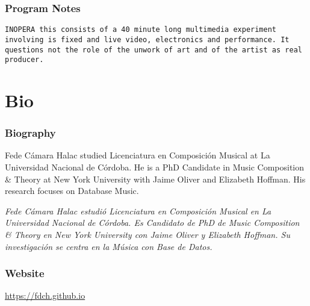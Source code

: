 \documentclass[
	12pt,
	letterpaper,
	oneside,
]{book}
\begin{document}
\section*{Program Notes}
\texttt{INOPERA this consists of a 40 minute long multimedia experiment involving is fixed and live video, electronics and performance. It questions not the role of the unwork of art and of the artist as real producer.}


\part*{Bio}

\section*{Biography}
Fede Cámara Halac studied Licenciatura en Composición Musical at La Universidad Nacional de Córdoba. He is a PhD Candidate in Music Composition & Theory at New York University with Jaime Oliver and Elizabeth Hoffman. His research focuses on Database Music.

\textit{
Fede Cámara Halac estudió Licenciatura en Composición Musical en La Universidad Nacional de Córdoba. Es Candidato de PhD de Music Composition & Theory en New York University con Jaime Oliver y Elizabeth Hoffman. Su investigación se centra en la Música con Base de Datos.
}

\section*{Website}
\url{https://fdch.github.io}
\tableofcontents
\end{document}
